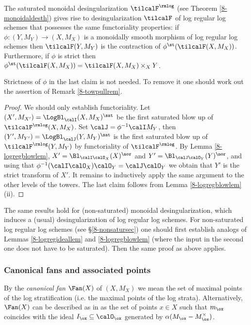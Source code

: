 \documentclass[10pt]{../fichiers-configuration-latex/smfart}
\begin{document}
\begin{theorem2}\label{8-deslogregth} The saturated
monoidal desingularization $\tilcalF^\rmlog$ (see Theorem
\ref{8-monoidaldesth}) gives rise to desingularization
$\tilcalF$ of log regular log schemes that possesses the same
functoriality properties: if $\phi{\colon}(Y,M_Y)\to(X,M_X)$
is a monoidally smooth morphism of log regular log
schemes then $\tilcalF(Y,M_Y)$ is the contraction of
$\phi^\st(\tilcalF(X,M_X))$. Furthermore, if $\phi$ is strict then
$\phi^\st(\tilcalF(X,M_X))=\tilcalF(X,M_X)\times_XY$.  \end{theorem2}
Strictness of $\phi$ in the last claim is not needed. To remove it
one should work out the assertion of Remark \ref{8-towpullrem}.
\begin{proof} We should only establish functoriality. Let
$(X',M_{X'})=\LogBl_\calI(X,M_X)^\sat$ be the first saturated blow
up of $\tilcalF^\rmlog(X,M_X)$. Set $\calJ=\phi^{-1}\calI M_Y$, then
$(Y',M_{Y'})=\LogBl_\calJ(Y,M_Y)^\sat$ is the first saturated blow up
of $\tilcalF^\rmlog(Y,M_Y)$ by functoriality of $\tilcalF^\rmlog$. By
Lemma \ref{8-logregblowlem}, $X'=\Bl_{\calI\calO_X}(X)^\nor$
and $Y'=\Bl_{\calJ\calO_Y}(Y)^\nor$, and using that
$\phi^{-1}(\calI\calO_X)\calO_Y=\calJ\calO_Y$ we obtain that $Y'$
is the strict transform of $X'$. It remains to inductively apply
the same argument to the other levels of the towers. The last claim
follows from Lemma \ref{8-logregblowlem}(ii).  \end{proof}

\begin{remark2} The same results hold for (non-saturated) monoidal
desingularization, which induces a (usual) desingularization of
log regular log schemes. For non-saturated log regular log schemes
(see \S\ref{8-nonsatursec}) one should first establish analogs of
Lemmas \ref{8-logregideallem} and \ref{8-logregblowlem} (where the
input in the second one does not have to be saturated). Then the
same proof as above applies.  \end{remark2}

\subsubsection{Canonical fans and associated
points}\label{8-canonfansec} By the {\em canonical fan} $\Fan(X)$ of $(X,M_X)$
we mean the set of maximal points of the log stratification (i.e. the maximal
points of the log strata). Alternatively, $\Fan(X)$ can be described as in
\cite[\S2.2]{Toric@Niziol} as the set of points $x\in X$ such that
$m_\ox$ coincides with the ideal $I_\ox\subseteq\calO_\ox$
generated by $\alpha(M_\ox-M_\ox^\times)$.
\end{document}
